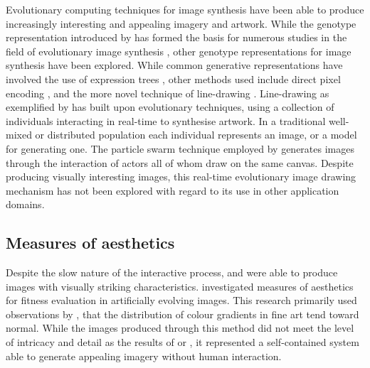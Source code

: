 \documentclass{article}
\begin{document}
Evolutionary computing techniques for image synthesis have been able to produce increasingly interesting and appealing imagery and artwork.
While the genotype representation introduced by \citet{sims} has formed the basis for numerous studies in the field of evolutionary image synthesis \citep{den2011evolving,den2010using,nevar,den2012maintaining,distributed-evolutionary-art}, other genotype representations for image synthesis have been explored.
While common generative representations have involved the use of expression trees \citep{sims,nevar,aesthetic-measures}, other methods used include direct pixel encoding \citep{nguyen2015deep}, and the more novel technique of line-drawing \citep{annunziato1998nagual,niche-reproduction}.
Line-drawing as exemplified by \citet{niche-reproduction} has built upon evolutionary techniques, using a collection of individuals interacting in real-time to synthesise artwork.
In a traditional well-mixed \citep{sims} or distributed population \citep{distributed-evolutionary-art} each individual represents an image, or a model for generating one.
The particle swarm technique employed by \citet{niche-reproduction} generates images through the interaction of actors all of whom draw on the same canvas.
Despite producing visually interesting images, this real-time evolutionary image drawing mechanism has not been explored with regard to its use in other application domains.


\subsection{Measures of aesthetics}

Despite the slow nature of the interactive process, \citet{sims} and \citet{nevar} were able to produce images with visually striking characteristics.
\citet{aesthetic-measures} investigated measures of aesthetics for fitness evaluation in artificially evolving images.
This research primarily used observations by \citet{ralph-bell-curve}, that the distribution of colour gradients in fine art tend toward normal.
While the images produced through this method did not meet the level of intricacy and detail as the results of \citet{sims} or \citet{nevar}, it represented a self-contained system able to generate appealing imagery without human interaction.
\end{document}
